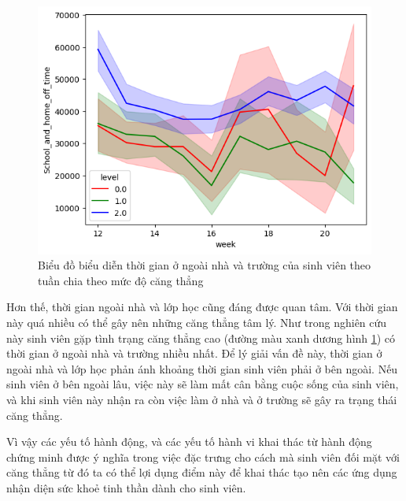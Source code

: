 \begin{figure}[!ht]
    \centering
    \includegraphics[width=0.75\linewidth]{line_week_home_a_school_off.png}
    \caption{Biểu đồ biểu diễn thời gian ở ngoài nhà và trường của sinh viên theo tuần chia theo mức độ căng thẳng}
    \label{line_week_homeaschooloff}
\end{figure}

Hơn thế, thời gian ngoài nhà và lớp học cũng đáng được quan tâm. Với thời gian này quá nhiều có thể gây nên những căng thẳng tâm lý. Như trong nghiên cứu này sinh viên gặp tình trạng căng thẳng cao (đường màu xanh dương hình \ref{line_week_homeaschooloff}) có thời gian ở ngoài nhà và trường nhiều nhất. Để lý giải vấn đề này, thời gian ở ngoài nhà và lớp học phản ánh khoảng thời gian sinh viên phải ở bên ngoài. Nếu sinh viên ở bên ngoài lâu, việc này sẽ làm mất cân bằng cuộc sống của sinh viên, và khi sinh viên này nhận ra còn việc làm ở nhà và ở trường sẽ gây ra trạng thái căng thẳng.


Vì vậy các yếu tố hành động, và các yếu tố hành vi khai thác từ hành động chứng minh được ý nghĩa trong việc đặc trưng cho cách mà sinh viên đối mặt với căng thẳng từ đó ta có thể lợi dụng điểm này để khai thác tạo nên các ứng dụng nhận diện sức khoẻ tinh thần dành cho sinh viên.


